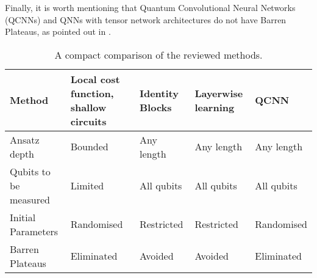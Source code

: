 Finally, it is worth mentioning that Quantum Convolutional Neural Networks (QCNNs) and QNNs with tensor network architectures do not have Barren Plateaus, as pointed out in \cite{congQuantumConvolutionalNeural2019}.

\begin{table}[]
    \centering
    \begin{tabular}{|p{3cm}|p{2cm}|p{2cm}|p{2cm}|p{2cm}|}
        \hline
        Method              & Local cost function, shallow circuits & Identity Blocks   & Layerwise learning    & QCNN \\
        \hline
        Ansatz depth        & Bounded                               & Any length        & Any length            & Any length \\
        \hline
        Qubits to be measured    & Limited                          & All qubits        & All qubits            & All qubits \\
        \hline
        Initial Parameters  & Randomised                            & Restricted        & Restricted            & Randomised \\
        \hline
        Barren Plateaus     & Eliminated                            & Avoided           & Avoided               & Eliminated \\
        \hline
    \end{tabular}
    \caption{A compact comparison of the reviewed methods.}
    \label{quick comparison of methods}
\end{table}